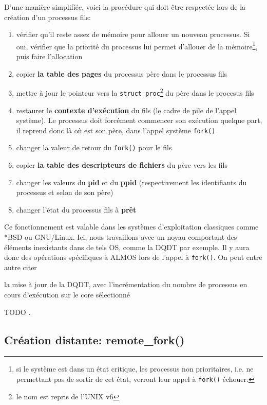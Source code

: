     D'une manière simplifíée, voici la procédure qui doit être respectée lors de
    la création d'un processus fils:
    \begin{enumerate}
      \item vérifier qu'il reste assez de mémoire pour allouer un nouveau
        processus. Si oui, vérifier que la priorité du processus lui permet
        d'allouer de la mémoire\footnote{si le système est dans un état
          critique, les processus non prioritaires, i.e. ne permettant pas de
          sortir de cet état, verront leur appel à \texttt{fork()}
            échouer.}, puis faire l'allocation
      \item copier \textbf{la table des pages} du processus père dans le
        processus fils
      \item mettre à jour le pointeur vers la \texttt{struct proc}\footnote{le
        nom est repris de l'UNIX v6} du père dans le procesus fils
      \item restaurer le \textbf{contexte d'exécution} du fils (le cadre de pile
        de l'appel système). Le processus doit forcément commencer son exécution
        quelque part, il reprend donc là où est son père, dans l'appel système
        \texttt{fork()}
      \item changer la valeur de retour du \texttt{fork()} pour le fils
      \item copier \textbf{la table des descripteurs de fichiers} du
        père vers les fils
      \item changer les valeurs du \textbf{pid} et du \textbf{ppid}
        (respectivement les identifiants du processus et selon de son père)
      \item changer l'état du processus fils à \textbf{prêt}
    \end{enumerate}

    Ce fonctionnement est valable dans les systèmes d'exploitation classiques
    comme *BSD ou GNU/Linux. Ici, nous travaillons avec un noyau comportant des
    éléments inexistants dans de tels OS, comme la DQDT par exemple. Il y aura
    donc des opérations spécifiques à ALMOS lors de l'appel à
    \texttt{fork()}. On peut entre autre citer \benumline \item la mise à jour
    de la DQDT, avec l'incrémentation du nombre de processus en cours
    d'exécution sur le core sélectionné \item TODO \eenumline.


  \subsection{Création distante: remote\_fork()}
  \label{subsec:principes}

